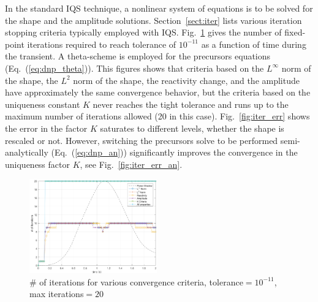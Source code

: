 \documentclass{elsarticle}
\newcommand{\eqt}[1]{Eq.~(\ref{#1})}                     %
\newcommand{\fig}[1]{Fig.~\ref{#1}}                      %
\newcommand{\sct}[1]{Section~\ref{#1}}                   %
\begin{document}
In the standard IQS technique, a nonlinear system of equations is to be solved for the shape and the amplitude solutions. \sct{sect:iter} lists various iteration stopping criteria typically employed with IQS. \fig{fig:iter} gives the number of fixed-point iterations required to reach tolerance of $10^{-11}$ as a function of time during the transient. A theta-scheme is employed for the precursors equations (\eqt{eq:dnp_theta}).
This figures shows that criteria based on the  $L^{\infty}$ norm of the shape, the $L^2$ norm of the shape, the reactivity change, and the amplitude have approximately the same convergence behavior, but the criteria based on the uniqueness constant $K$ never reaches the tight tolerance and runs up to the maximum number of iterations allowed (20 in this case). \fig{fig:iter_err} shows the error in the factor $K$ saturates to different levels, whether the shape is rescaled or not.
However, switching the precursors solve to be performed semi-analytically (\eqt{eq:dnp_an}) significantly improves the convergence in the uniqueness factor $K$, see \fig{fig:iter_err_an}.

\begin{figure}[!htbp]
\centering
\includegraphics[width=0.49\textwidth]{figures/iter_renorm.png}
\caption{\# of iterations for various convergence criteria, tolerance$=10^{-11}$, max iterations$=20$}
\label{fig:iter}
\end{figure}
\end{document}
